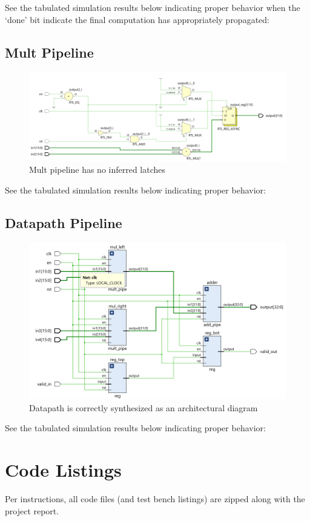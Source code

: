 \documentclass{article}
\begin{document}
See the tabulated simulation results below indicating proper behavior when the `done' bit indicate the final computation has appropriately propagated:


\subsection{Mult Pipeline}
\begin{figure}[H]
	\centering
	\includegraphics[width=\linewidth]{figures/mult_pipe}
	\caption{Mult pipeline has no inferred latches}
\end{figure}

See the tabulated simulation results below indicating proper behavior:



\subsection{Datapath Pipeline}
\begin{figure}[H]
	\centering
	\includegraphics[width=\linewidth]{figures/datapath}
	\caption{Datapath is correctly synthesized as an architectural diagram}
\end{figure}

See the tabulated simulation results below indicating proper behavior:




\section{Code Listings}
Per instructions, all code files (and test bench listings) are zipped along with the project report.
\end{document}
